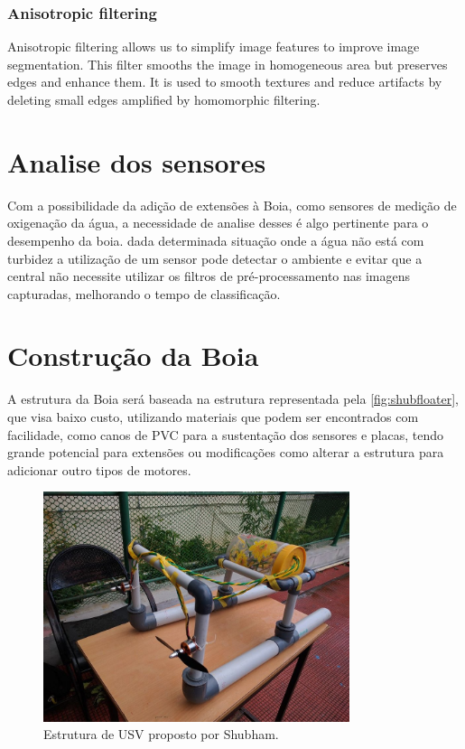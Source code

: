 \subsubsection{Anisotropic filtering}
 Anisotropic filtering allows us to simplify image features to improve image segmentation. This filter smooths the image in homogeneous area but preserves edges and enhance them. It is used to smooth textures and reduce artifacts by deleting small edges amplified by homomorphic filtering.


\section{Analise dos sensores}
Com a possibilidade da adição de extensões à Boia, como sensores de medição de oxigenação da água, a necessidade de analise desses é algo pertinente para o desempenho da boia. dada determinada situação onde a água não está com turbidez a utilização de um sensor pode detectar o ambiente e evitar que a central não necessite utilizar os filtros de pré-processamento nas imagens capturadas, melhorando o tempo de classificação.



\section{Construção da Boia}
A estrutura da Boia será baseada na estrutura representada pela  \autoref{fig:shubfloater}, que visa baixo custo, utilizando materiais que podem ser encontrados com facilidade, como canos de PVC para a sustentação dos sensores e placas, tendo grande potencial para extensões ou modificações como alterar a estrutura para adicionar outro tipos de motores.

\begin{figure}[ht]
	\caption{\label{fig:shubfloater}  Estrutura de USV proposto por 
	Shubham.}
	 \begin{center}
		\includegraphics[width = 0.8\textwidth]			{resources/shubhamfloater}
    \end{center}
\end{figure}



